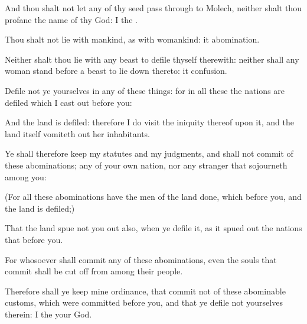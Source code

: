 {And thou shalt
not let any of thy
seed
pass through
{} to
Molech, neither shalt thou
profane the
name of thy
God: I
{} the
{}.

Thou shalt not
lie with
mankind, as
with
womankind: it
{}
abomination.

Neither shalt
thou
lie with any
beast to
defile thyself therewith: neither shall any
woman
stand
before a
beast to lie
down thereto: it
{}
confusion.

Defile not ye yourselves in any of these
things: for in all these the
nations are
defiled which I cast
out
before you:

And the
land is
defiled: therefore I do
visit the
iniquity thereof upon it, and the
land itself vomiteth
out her
inhabitants.

Ye shall therefore
keep my
statutes and my
judgments, and shall not
commit
{} of these
abominations;
{} any of your own
nation, nor any
stranger that
sojourneth
among you:

(For all
these
abominations have the
men of the
land
done, which
{}
before you, and the
land is
defiled;)

That the
land spue not you
out also, when ye
defile it, as it spued
out the
nations that
{}
before you.

For whosoever shall
commit any of these
abominations, even the
souls that
commit
{} shall be cut
off from
among their
people.

Therefore shall ye
keep mine
ordinance, that
{}
commit not
{} of these
abominable
customs, which were
committed
before you, and that ye
defile not yourselves therein: I
{} the
{} your
God.




\par }
